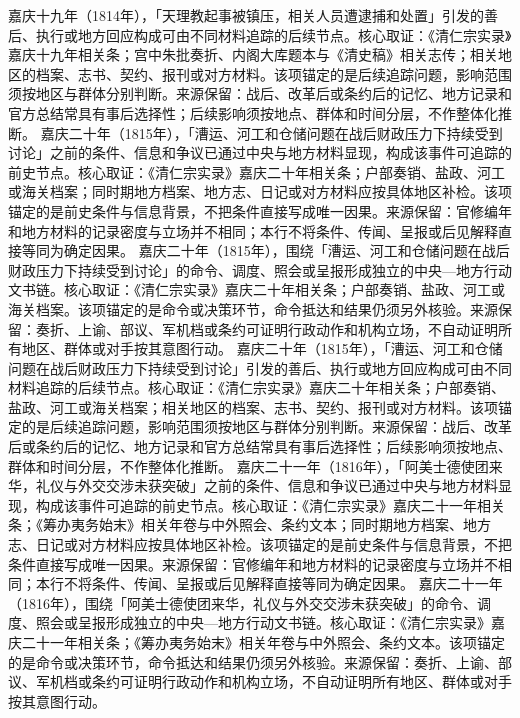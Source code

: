嘉庆十九年（1814年），「天理教起事被镇压，相关人员遭逮捕和处置」引发的善后、执行或地方回应构成可由不同材料追踪的后续节点。核心取证：《清仁宗实录》嘉庆十九年相关条；宫中朱批奏折、内阁大库题本与《清史稿》相关志传；相关地区的档案、志书、契约、报刊或对方材料。该项锚定的是后续追踪问题，影响范围须按地区与群体分别判断。来源保留：战后、改革后或条约后的记忆、地方记录和官方总结常具有事后选择性；后续影响须按地点、群体和时间分层，不作整体化推断。
嘉庆二十年（1815年），「漕运、河工和仓储问题在战后财政压力下持续受到讨论」之前的条件、信息和争议已通过中央与地方材料显现，构成该事件可追踪的前史节点。核心取证：《清仁宗实录》嘉庆二十年相关条；户部奏销、盐政、河工或海关档案；同时期地方档案、地方志、日记或对方材料应按具体地区补检。该项锚定的是前史条件与信息背景，不把条件直接写成唯一因果。来源保留：官修编年和地方材料的记录密度与立场并不相同；本行不将条件、传闻、呈报或后见解释直接等同为确定因果。
嘉庆二十年（1815年），围绕「漕运、河工和仓储问题在战后财政压力下持续受到讨论」的命令、调度、照会或呈报形成独立的中央—地方行动文书链。核心取证：《清仁宗实录》嘉庆二十年相关条；户部奏销、盐政、河工或海关档案。该项锚定的是命令或决策环节，命令抵达和结果仍须另外核验。来源保留：奏折、上谕、部议、军机档或条约可证明行政动作和机构立场，不自动证明所有地区、群体或对手按其意图行动。
嘉庆二十年（1815年），「漕运、河工和仓储问题在战后财政压力下持续受到讨论」引发的善后、执行或地方回应构成可由不同材料追踪的后续节点。核心取证：《清仁宗实录》嘉庆二十年相关条；户部奏销、盐政、河工或海关档案；相关地区的档案、志书、契约、报刊或对方材料。该项锚定的是后续追踪问题，影响范围须按地区与群体分别判断。来源保留：战后、改革后或条约后的记忆、地方记录和官方总结常具有事后选择性；后续影响须按地点、群体和时间分层，不作整体化推断。
嘉庆二十一年（1816年），「阿美士德使团来华，礼仪与外交交涉未获突破」之前的条件、信息和争议已通过中央与地方材料显现，构成该事件可追踪的前史节点。核心取证：《清仁宗实录》嘉庆二十一年相关条；《筹办夷务始末》相关年卷与中外照会、条约文本；同时期地方档案、地方志、日记或对方材料应按具体地区补检。该项锚定的是前史条件与信息背景，不把条件直接写成唯一因果。来源保留：官修编年和地方材料的记录密度与立场并不相同；本行不将条件、传闻、呈报或后见解释直接等同为确定因果。
嘉庆二十一年（1816年），围绕「阿美士德使团来华，礼仪与外交交涉未获突破」的命令、调度、照会或呈报形成独立的中央—地方行动文书链。核心取证：《清仁宗实录》嘉庆二十一年相关条；《筹办夷务始末》相关年卷与中外照会、条约文本。该项锚定的是命令或决策环节，命令抵达和结果仍须另外核验。来源保留：奏折、上谕、部议、军机档或条约可证明行政动作和机构立场，不自动证明所有地区、群体或对手按其意图行动。
